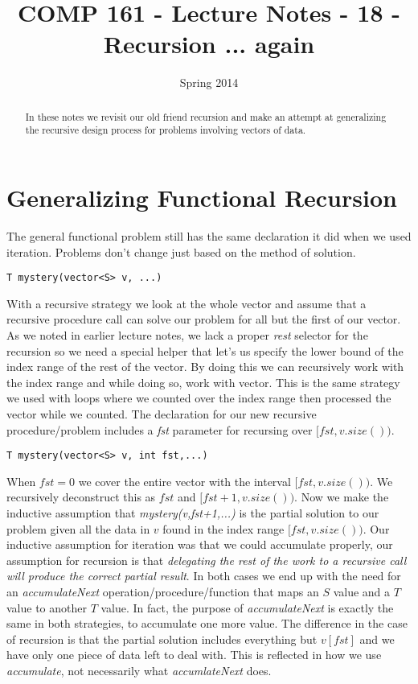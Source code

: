 \documentclass[]{tufte-handout}
\title{COMP 161 - Lecture Notes - 18 - Recursion ... again}
\date{Spring 2014}
\begin{document}
 
\maketitle

\begin{abstract}
In these notes we revisit our old friend recursion and make an attempt at generalizing the recursive design process for problems involving vectors of data.
\end{abstract}

\section{Generalizing Functional Recursion}

The general functional problem still has the same declaration it did when we used iteration.  Problems don't change just based on the method of solution. 
\begin{verbatim}
T mystery(vector<S> v, ...)
\end{verbatim}
With a recursive strategy we look at the whole vector and assume that a recursive procedure call can solve our problem for all but the first of our vector. As we noted in earlier lecture notes, we lack a proper \textit{rest} selector for the recursion so we need a special helper that let's us specify the lower bound of the index range of the rest of the vector. By doing this we can recursively work with the index range and while doing so, work with vector.  This is the same strategy we used with loops where we counted over the index range then processed the vector while we counted.  The declaration for our new recursive procedure/problem includes a \textit{fst} parameter for recursing over $[fst,v.size() )$.

\begin{verbatim}
T mystery(vector<S> v, int fst,...)
\end{verbatim}

When $fst=0$ we cover the entire vector with the interval $[fst,v.size() )$.  We recursively deconstruct this as $fst$ and $[fst+1,v.size())$. Now we make the inductive assumption that \textit{mystery(v,fst+1,...)} is the partial solution to our problem given all the data in $v$ found in the index range $[fst,v.size() )$.  Our inductive assumption for iteration was that we could accumulate properly, our assumption for recursion is that \textit{delegating the rest of the work to a recursive call will produce the correct partial result}. In both cases we end up with the need for an \textit{accumulateNext} operation/procedure/function that maps an $S$ value and a $T$ value to another $T$ value.  In fact, the purpose of \textit{accumulateNext} is exactly the same in both strategies, to accumulate one more value. The difference in the case of recursion is that the partial solution includes everything but $v[fst]$ and we have only one piece of data left to deal with. This is reflected in how we use \textit{accumulate}, not necessarily what \textit{accumlateNext} does.
\end{document}
